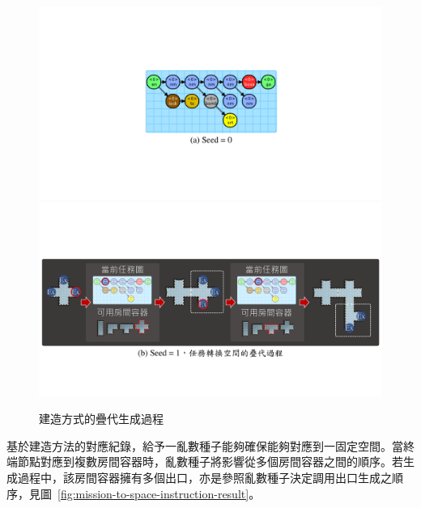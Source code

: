 \begin{figure}[!htb]
  \begin{center}
    \includegraphics[width=1.0\textwidth]{figures/mission-to-space-instruction-flow.pdf}
    \includegraphics[width=1.0\textwidth]{figures/mission-to-space-instruction-flow-.pdf}
    \caption{建造方式的疊代生成過程} 
    \label{fig:mission-to-space-instruction-flow}
  \end{center}
\end{figure}

基於建造方法的對應紀錄，給予一亂數種子能夠確保能夠對應到一固定空間。當終端節點對應到複數房間容器時，亂數種子將影響從多個房間容器之間的順序。若生成過程中，該房間容器擁有多個出口，亦是參照亂數種子決定調用出口生成之順序，見圖~\ref{fig:mission-to-space-instruction-result}。


